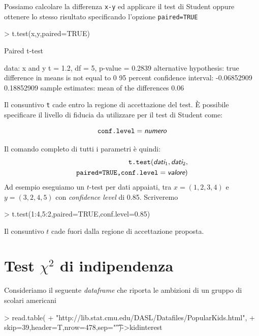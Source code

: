 \documentclass[onecolumn,11pt]{book}
\newcommand{\varia}[1]{\textsl{\textsf{#1}}}
\begin{document}
Possiamo calcolare la differenza \texttt{x-y} ed applicare il test di Student oppure ottenere lo stesso risultato specificando l'opzione \texttt{paired=TRUE}
\begin{Schunk}
\begin{Sinput}
>  t.test(x,y,paired=TRUE)
\end{Sinput}
\begin{Soutput}
	Paired t-test

data:  x and y
t = 1.2, df = 5, p-value = 0.2839
alternative hypothesis: true difference in means is not equal to 0
95 percent confidence interval:
 -0.06852909  0.18852909
sample estimates:
mean of the differences 
                   0.06 
\end{Soutput}
\end{Schunk}

Il consuntivo   \texttt{t} cade entro la regione di accettazione del test.
\`E  possibile specificare il livello di fiducia da utilizzare per il test di Student come: 

$$\texttt{conf.level}=\varia{numero}$$

Il comando completo di tutti i parametri  \`e quindi:
\begin{eqnarray*}
\texttt{t.test}(\varia{dati}_1,\varia{dati}_2,
\\
\texttt{paired=TRUE,conf.level}=\varia{valore})
\end{eqnarray*}
Ad esempio eseguiamo un $t$-test per dati appaiati, tra $x=(1,2,3,4)$ e $y=(3,2,4,5)$ con {\it confidence level} di 0.85. Scriveremo
\begin{Schunk}
\begin{Sinput}
> t.test(1:4,5:2,paired=TRUE,conf.level=0.85)
\end{Sinput}
\end{Schunk}
 Il consuntivo $t$ cade fuori dalla regione di accettazione proposta. 
 
 \section{Test $\chi^2$  di indipendenza}

Consideriamo il seguente \emph{dataframe} che riporta le ambizioni di un gruppo di scolari americani   
\begin{Schunk}
\begin{Sinput}
> read.table(
+ "http://lib.stat.cmu.edu/DASL/Datafiles/PopularKids.html",
+ skip=39,header=T,nrow=478,sep="\t")->kidinterest
\end{Sinput}
\end{Schunk}
\end{document}
